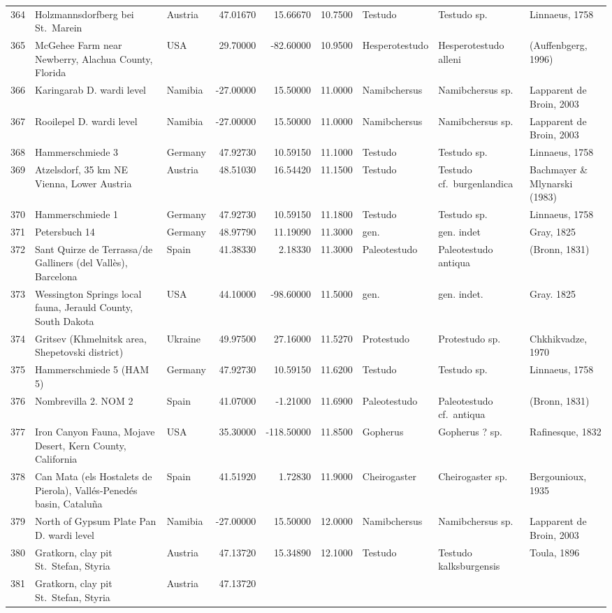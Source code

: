 \begin{landscape}
{\begin{longtable}[]{@{}lllrrrlll@{}}
364 & Holzmannsdorfberg bei St.~Marein & Austria & 47.01670 & 15.66670 &
10.7500 & Testudo & Testudo sp. & Linnaeus, 1758\tabularnewline
365 & McGehee Farm near Newberry, Alachua County, Florida & USA &
29.70000 & -82.60000 & 10.9500 & Hesperotestudo & Hesperotestudo alleni
& (Auffenbgerg, 1996)\tabularnewline
366 & Karingarab D. wardi level & Namibia & -27.00000 & 15.50000 &
11.0000 & Namibchersus & Namibchersus sp. & Lapparent de Broin,
2003\tabularnewline
367 & Rooilepel D. wardi level & Namibia & -27.00000 & 15.50000 &
11.0000 & Namibchersus & Namibchersus sp. & Lapparent de Broin,
2003\tabularnewline
368 & Hammerschmiede 3 & Germany & 47.92730 & 10.59150 & 11.1000 &
Testudo & Testudo sp. & Linnaeus, 1758\tabularnewline
369 & Atzelsdorf, 35 km NE Vienna, Lower Austria & Austria & 48.51030 &
16.54420 & 11.1500 & Testudo & Testudo cf.~burgenlandica & Bachmayer \&
Mlynarski (1983)\tabularnewline
370 & Hammerschmiede 1 & Germany & 47.92730 & 10.59150 & 11.1800 &
Testudo & Testudo sp. & Linnaeus, 1758\tabularnewline
371 & Petersbuch 14 & Germany & 48.97790 & 11.19090 & 11.3000 & gen. &
gen. indet & Gray, 1825\tabularnewline
372 & Sant Quirze de Terrassa/de Galliners (del Vallès), Barcelona &
Spain & 41.38330 & 2.18330 & 11.3000 & Paleotestudo & Paleotestudo
antiqua & (Bronn, 1831)\tabularnewline
373 & Wessington Springs local fauna, Jerauld County, South Dakota & USA
& 44.10000 & -98.60000 & 11.5000 & gen. & gen. indet. & Gray.
1825\tabularnewline
374 & Gritsev (Khmelnitsk area, Shepetovski district) & Ukraine &
49.97500 & 27.16000 & 11.5270 & Protestudo & Protestudo sp. &
Chkhikvadze, 1970\tabularnewline
375 & Hammerschmiede 5 (HAM 5) & Germany & 47.92730 & 10.59150 & 11.6200
& Testudo & Testudo sp. & Linnaeus, 1758\tabularnewline
376 & Nombrevilla 2. NOM 2 & Spain & 41.07000 & -1.21000 & 11.6900 &
Paleotestudo & Paleotestudo cf.~antiqua & (Bronn, 1831)\tabularnewline
377 & Iron Canyon Fauna, Mojave Desert, Kern County, California & USA &
35.30000 & -118.50000 & 11.8500 & Gopherus & Gopherus ? sp. &
Rafinesque, 1832\tabularnewline
378 & Can Mata (els Hostalets de Pierola), Vallés-Penedés basin,
Cataluña & Spain & 41.51920 & 1.72830 & 11.9000 & Cheirogaster &
Cheirogaster sp. & Bergounioux, 1935\tabularnewline
379 & North of Gypsum Plate Pan D. wardi level & Namibia & -27.00000 &
15.50000 & 12.0000 & Namibchersus & Namibchersus sp. & Lapparent de
Broin, 2003\tabularnewline
380 & Gratkorn, clay pit St.~Stefan, Styria & Austria & 47.13720 &
15.34890 & 12.1000 & Testudo & Testudo kalksburgensis & Toula,
1896\tabularnewline
381 & Gratkorn, clay pit St.~Stefan, Styria & Austria & 47.13720 &

\end{longtable}}
\end{landscape}
